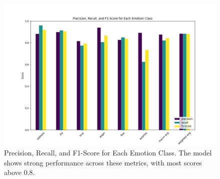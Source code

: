\begin{figure}[H]
    \centering
    \includegraphics[width=1\columnwidth]{images/Classification_report_model4.png}
    \caption{Precision, Recall, and F1-Score for Each Emotion Class. The model shows strong performance across these metrics, with most scores above 0.8.}
    \label{fig:sequential_model_performance}
\end{figure}
